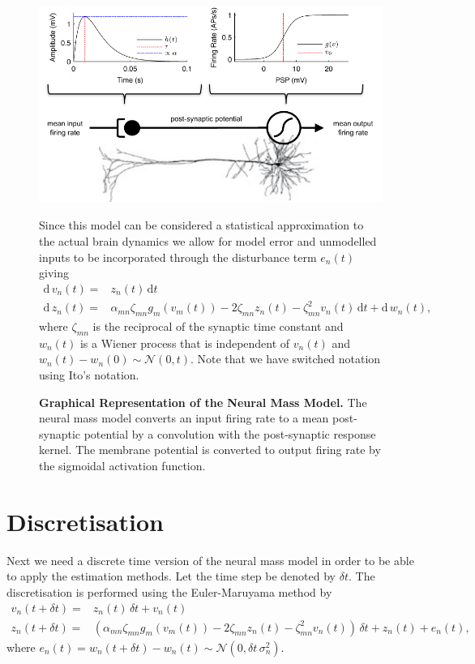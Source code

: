 \documentclass[]{article}
\begin{document}
\begin{figure}[ht]
	\centering
		\includegraphics[scale=1]{./Figures/pdf/StandardNeuralMass.pdf}
	\caption{\textbf{Graphical Representation of the Neural Mass Model.} The neural mass model converts an input firing rate to a mean post-synaptic potential by a convolution with the post-synaptic response kernel. The membrane potential is converted to output firing rate by the sigmoidal activation function.} 

Since this model can be considered a statistical approximation to the actual brain dynamics we allow for model error and unmodelled inputs to be incorporated through the disturbance term $e_n(t)$ giving
\begin{align}
	\mathrm{d}\, v_n(t) =& z_n(t)\,\mathrm{d}t \\
	\mathrm{d}\, z_n(t) =& \alpha_{mn}\zeta_{mn} g_m(v_m(t)) - 2\zeta_{mn}z_n(t) - \zeta^2_{mn} v_n(t)\,\mathrm{d}t + \mathrm{d}\,w_n(t),
\end{align}
where $\zeta_{mn}$ is the reciprocal of the synaptic time constant and $w_n(t)$ is a Wiener process that is independent of $v_n(t)$ and $w_n(t) - w_n(0) \sim \mathcal{N}(0,t)$. Note that we have switched notation using Ito's notation.


	\label{fig:StandardNeuralMass}
\end{figure}

\section{Discretisation}
Next we need a discrete time version of the neural mass model in order to be able to apply the estimation methods. Let the time step be denoted by $\delta t$. The discretisation is performed using the Euler-Maruyama method by
\begin{align}
	v_n(t+\delta t) = & z_n(t)\,\delta t + v_n(t) \\
	z_n(t+\delta t) =& \left(\alpha_{mn}\zeta_{mn} g_m(v_m(t)) - 2\zeta_{mn}z_n(t) - \zeta^2_{mn} v_n(t)\right)\,\delta t + z_n(t) + e_n(t),
\end{align}
where $e_n(t) = w_n(t + \delta t) - w_n(t) \sim \mathcal{N}(0,\delta t \,\sigma_n^2)$.
\end{document}
